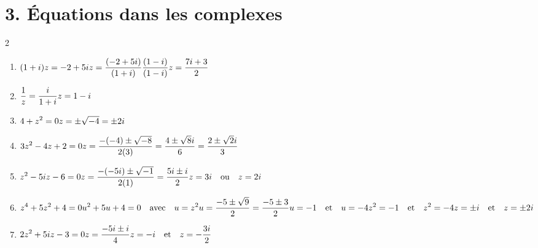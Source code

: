 \section*{3. Équations dans les complexes}
\begin{solution}
    \text{ }
    
    \begin{multicols}{2}
    \begin{enumerate}[label=(\alph*)]
        \item $\displaystyle (1 + i)z = -2 + 5i \\
        z = \frac{(-2 + 5i)}{(1 + i)}\frac{(1 - i)}{(1 -i)} \\
        z = \frac{7i + 3}{2}$

        \columnbreak

        \item $\displaystyle \frac1z = \frac{i}{1+i} \\
        z = 1 - i$
        \item $\displaystyle 4 + z^2 = 0 \\
        z = \pm \sqrt{-4} = \pm 2i$
        \item $\displaystyle 3z^2 - 4z + 2 = 0 \\
        z = \frac{-(-4) \pm \sqrt{-8}}{2(3)} = \frac{4 \pm \sqrt{8}i}{6} = \frac{2 \pm \sqrt{2}i}{3}$
        \item $\displaystyle z^2 - 5iz - 6 = 0 \\
        z = \frac{-(-5i) \pm \sqrt{-1}}{2(1)} = \frac{5i \pm i}{2} \\
        z = 3i \quad \text{ou} \quad z = 2i$

        \columnbreak
        
        \item $\displaystyle z^4 + 5z^2 + 4 = 0 \\
        u^2 + 5u + 4 = 0 \quad \text{avec} \quad u = z^2 \\
        u = \frac{-5 \pm \sqrt{9}}{2} = \frac{-5 \pm 3}{2} \\
        u = -1 \quad \text{et} \quad u = -4 \\
        z^2 = -1 \quad \text{et} \quad z^2 = -4 \\
        z = \pm i \quad \text{et} \quad z = \pm 2i$
        \item $\displaystyle 2z^2 + 5iz - 3 = 0 \\
        z = \frac{-5i \pm i}{4}\\
        z = -i \quad \text{et} \quad z = -\frac{3i}{2}$
    \end{enumerate}
    \end{multicols}


\end{solution}
